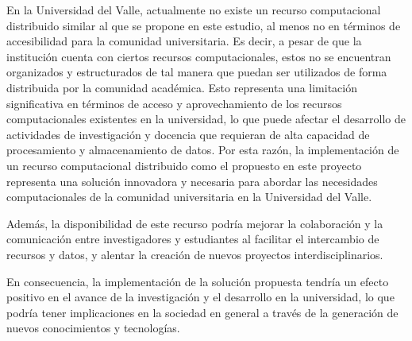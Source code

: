\begin{spacing}{1.5}
    En la Universidad del Valle, actualmente no existe un recurso computacional distribuido similar al que se propone en este estudio, al menos no en términos de accesibilidad para la comunidad universitaria. Es decir, a pesar de que la institución cuenta con ciertos recursos computacionales, estos no se encuentran organizados y estructurados de tal manera que puedan ser utilizados de forma distribuida por la comunidad académica. Esto representa una limitación significativa en términos de acceso y aprovechamiento de los recursos computacionales existentes en la universidad, lo que puede afectar el desarrollo de actividades de investigación y docencia que requieran de alta capacidad de procesamiento y almacenamiento de datos. Por esta razón, la implementación de un recurso computacional distribuido como el propuesto en este proyecto representa una solución innovadora y necesaria para abordar las necesidades computacionales de la comunidad universitaria en la Universidad del Valle.

    Además, la disponibilidad de este recurso podría mejorar la colaboración y la comunicación entre investigadores y estudiantes al facilitar el intercambio de recursos y datos, y alentar la creación de nuevos proyectos interdisciplinarios.

    En consecuencia, la implementación de la solución propuesta tendría un efecto positivo en el avance de la investigación y el desarrollo en la universidad, lo que podría tener implicaciones en la sociedad en general a través de la generación de nuevos conocimientos y tecnologías.


\end{spacing}

